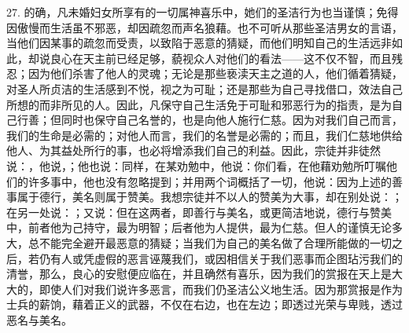 27. 的确，凡未婚妇女所享有的一切属神喜乐中，她们的圣洁行为也当谨慎；免得因傲慢而生活虽不邪恶，却因疏忽而声名狼藉。也不可听从那些圣洁男女的言语，当他们因某事的疏忽而受责，以致陷于恶意的猜疑，而他们明知自己的生活远非如此，却说良心在天主前已经足够，藐视众人对他们的看法——这不仅不智，而且残忍；因为他们杀害了他人的灵魂；无论是那些亵渎天主之道的人，他们循着猜疑，对圣人所贞洁的生活感到不悦，视之为可耻；还是那些为自己寻找借口，效法自己所想的而非所见的人。因此，凡保守自己生活免于可耻和邪恶行为的指责，是为自己行善；但同时也保守自己名誉的，也是向他人施行仁慈。因为对我们自己而言，我们的生命是必需的；对他人而言，我们的名誉是必需的；而且，我们仁慈地供给他人、为其益处所行的事，也必将增添我们自己的利益。因此，宗徒并非徒然说：，他说，；他也说：同样，在某劝勉中，他说：你们看，在他藉劝勉所叮嘱他们的许多事中，他也没有忽略提到；并用两个词概括了一切，他说：因为上述的善事属于德行，美名则属于赞美。我想宗徒并不以人的赞美为大事，却在别处说：；在另一处说：；又说：但在这两者，即善行与美名，或更简洁地说，德行与赞美中，前者他为己持守，最为明智；后者他为人提供，最为仁慈。但人的谨慎无论多大，总不能完全避开最恶意的猜疑；当我们为自己的美名做了合理所能做的一切之后，若仍有人或凭虚假的恶言诬蔑我们，或因相信关于我们恶事而企图玷污我们的清誉，那么，良心的安慰便应临在，并且确然有喜乐，因为我们的赏报在天上是大大的，即使人们对我们说许多恶言，而我们仍圣洁公义地生活。因为那赏报是作为士兵的薪饷，藉着正义的武器，不仅在右边，也在左边；即透过光荣与卑贱，透过恶名与美名。\par

